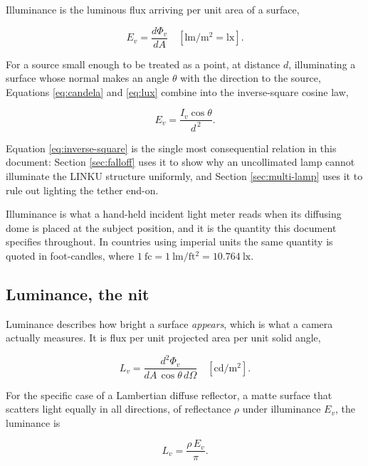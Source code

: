 Illuminance is the luminous flux arriving per unit area of a surface,

\begin{equation}
E_v = \frac{d\Phi_v}{dA} \quad \mathrm{[lm/m^2 = lx]} .
\label{eq:lux}
\end{equation}

For a source small enough to be treated as a point, at distance $d$, illuminating a surface whose normal makes an angle $\theta$ with the direction to the source, Equations \ref{eq:candela} and \ref{eq:lux} combine into the inverse-square cosine law,

\begin{equation}
E_v = \frac{I_v \cos\theta}{d^{\,2}} .
\label{eq:inverse-square}
\end{equation}

Equation \ref{eq:inverse-square} is the single most consequential relation in this document: Section \ref{sec:falloff} uses it to show why an uncollimated lamp cannot illuminate the LINKU structure uniformly, and Section \ref{sec:multi-lamp} uses it to rule out lighting the tether end-on.

Illuminance is what a hand-held incident light meter reads when its diffusing dome is placed at the subject position, and it is the quantity this document specifies throughout. In countries using imperial units the same quantity is quoted in foot-candles, where $1~\mathrm{fc} = 1~\mathrm{lm/ft^2} = 10.764~\mathrm{lx}$.

\subsection{Luminance, the nit}

Luminance describes how bright a surface \emph{appears}, which is what a camera actually measures. It is flux per unit projected area per unit solid angle,

\begin{equation}
L_v = \frac{d^2\Phi_v}{dA\,\cos\theta\,d\Omega} \quad \mathrm{[cd/m^2]} .
\label{eq:luminance}
\end{equation}

For the specific case of a Lambertian diffuse reflector, a matte surface that scatters light equally in all directions, of reflectance $\rho$ under illuminance $E_v$, the luminance is

\begin{equation}
L_v = \frac{\rho\, E_v}{\pi} .
\label{eq:lambertian}
\end{equation}

